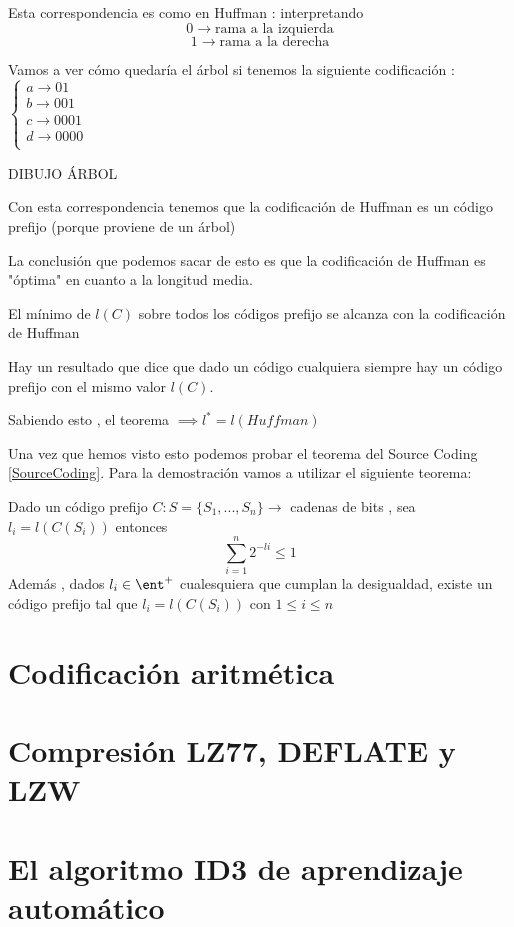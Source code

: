 Esta correspondencia es como en Huffman : interpretando 
$$0 \rightarrow \text{rama a la izquierda}$$
$$1 \rightarrow \text{rama a la derecha}$$

Vamos a ver cómo quedaría el árbol si tenemos la siguiente codificación : $\begin{cases}
a \rightarrow 01\\ b \rightarrow 001\\ c \rightarrow 0001\\ d \rightarrow 0000\\
\end{cases}$

DIBUJO ÁRBOL

Con esta correspondencia tenemos que la codificación de Huffman es un código prefijo (porque proviene de un árbol)

La conclusión que podemos sacar de esto es que la codificación de Huffman es "óptima" en cuanto a la longitud media.

\begin{theorem}
	El mínimo de $l(C)$ sobre todos los códigos prefijo se alcanza con la codificación de Huffman
\end{theorem}
\obs Hay un resultado que dice que dado un código cualquiera siempre hay un código prefijo con el mismo valor $l(C)$.

Sabiendo esto , el teorema $\implies l^{*}= l(Huffman)$



Una vez que hemos visto esto podemos probar el teorema del Source Coding \ref{SourceCoding}. Para la demostración vamos a utilizar el siguiente teorema:

\begin{theorem}
	Dado un código prefijo $C : S = \{S_1, ..., S_n\} \rightarrow $ {cadenas de bits} , sea $l_i = l (C(S_i))$ entonces
	$$\sum_{i=1}^{n} 2 ^{-li} \leq 1$$
	Además , dados $l_i \in \ent^{+}$ cualesquiera que cumplan la desigualdad, existe un código prefijo tal que $l_i = l(C(S_i))$ con $1\leq i \leq n$
\end{theorem}

\section{Codificación aritmética}
\section{Compresión LZ77, DEFLATE y LZW}
\section{El algoritmo ID3 de aprendizaje automático}

